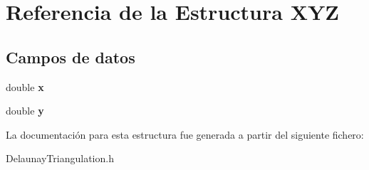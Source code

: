 \hypertarget{structXYZ}{}\section{Referencia de la Estructura X\+Y\+Z}
\label{structXYZ}
\subsection*{Campos de datos}
\begin{DoxyCompactItemize}
\item 
\hypertarget{structXYZ_a1f7f446eb3411e219da902419417c907}{}double {\bfseries x}\label{structXYZ_a1f7f446eb3411e219da902419417c907}

\item 
\hypertarget{structXYZ_ab3baa989a1b53304bc8a0b0a8d4afe61}{}double {\bfseries y}\label{structXYZ_ab3baa989a1b53304bc8a0b0a8d4afe61}

\end{DoxyCompactItemize}


La documentación para esta estructura fue generada a partir del siguiente fichero\+:\begin{DoxyCompactItemize}
\item 
Delaunay\+Triangulation.\+h\end{DoxyCompactItemize}
